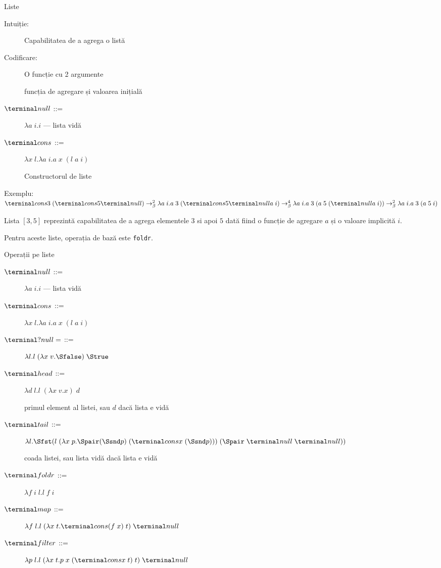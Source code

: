 \documentclass[xcolor=pdftex,romanian,colorlinks]{beamer}
\begin{document}
\begin{frame}{Liste}

  \begin{description}
    \item[Intuiție:] Capabilitatea de a agrega o listă
    \item[Codificare:] O funcție cu 2 argumente 
         
        funcția de agregare și valoarea inițială
    \item[$\Snull$ ::=] $\lambda a\; i.i$ --- lista vidă
    \item[$\Scons$ ::=] $\lambda x\; l.\lambda a\; i.a\; x\; (l\; a\; i)$

    Constructorul de liste

  \end{description}
    \begin{block}{Exemplu: $\Scons 3\; (\Scons 5 \Snull) \rightarrow^2_\beta
      \lambda a\; i.a\; 3\; (\Scons 5 \Snull a\; i) \rightarrow^4_\beta
      \lambda a\; i.a\; 3\; (a\; 5\; (\Snull a\; i)) \rightarrow^2_\beta
      \lambda a\; i.a\; 3\; (a\; 5\; i)
      $}
    
    Lista $[3, 5]$
    reprezintă capabilitatea de a agrega elementele $3$ si apoi $5$ dată
    fiind o funcție de agregare $a$ și o valoare implicită $i$.

    Pentru aceste liste, operația de bază este \texttt{foldr}.
    \end{block}
\end{frame}

\begin{frame}{Operații pe liste}

  \begin{description}
    \item[$\Snull$ ::=] $\lambda a\; i.i$ --- lista vidă
    \item[$\Scons$ ::=] $\lambda x\; l.\lambda a\; i.a\; x\; (l\; a\; i)$
    \item[]
    \pause
    \item[$\SisNull$ ::=] $\lambda l. l\; (\lambda x\; v.\Sfalse)\; \Strue$
    \pause
    \item[$\Shead$ ::=] $\lambda d\; l. l\; (\lambda x\; v.x)\; d$

    primul element al listei, sau $d$ dacă lista e vidă

    \pause
    \item[$\Stail$ ::=] $\lambda l. \Sfst (l\; (\lambda x\; p.\Spair (\Ssnd p)\; (\Scons x\; (\Ssnd p)))\; (\Spair\; \Snull\; \Snull))$

    coada listei, sau lista vidă dacă lista e vidă

    \item[$\Sfoldr$ ::=] $\lambda f\; i\; l. l\; f\; i$
    \item[$\Smap$ ::=] $\lambda f\; l. l\; (\lambda x\; t.\Scons (f\; x)\; t)\; \Snull$
    \item[$\Sfilter$ ::=] $\lambda p\; l. l\; (\lambda x\; t.p\; x\; (\Scons x\; t)\; t)\; \Snull$

  \end{description}
\end{frame}
\end{document}
